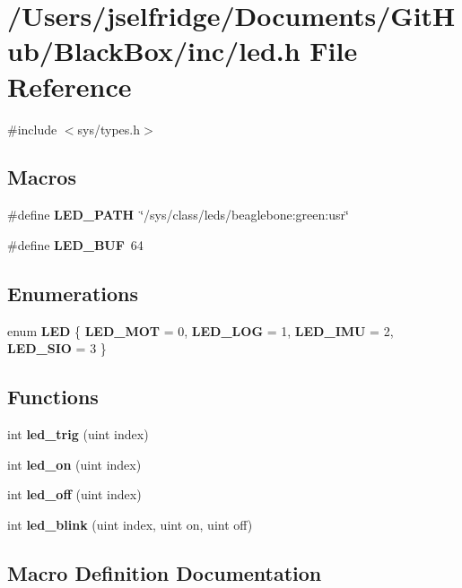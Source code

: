 \section{/\+Users/jselfridge/\+Documents/\+Git\+Hub/\+Black\+Box/inc/led.h File Reference}
\label{led_8h}
{\ttfamily \#include $<$sys/types.\+h$>$}\newline
\subsection*{Macros}
\begin{DoxyCompactItemize}
\item 
\#define \textbf{ L\+E\+D\+\_\+\+P\+A\+TH}~\char`\"{}/sys/class/leds/beaglebone\+:green\+:usr\char`\"{}
\item 
\#define \textbf{ L\+E\+D\+\_\+\+B\+UF}~64
\end{DoxyCompactItemize}
\subsection*{Enumerations}
\begin{DoxyCompactItemize}
\item 
enum \textbf{ L\+ED} \{ \textbf{ L\+E\+D\+\_\+\+M\+OT} = 0, 
\textbf{ L\+E\+D\+\_\+\+L\+OG} = 1, 
\textbf{ L\+E\+D\+\_\+\+I\+MU} = 2, 
\textbf{ L\+E\+D\+\_\+\+S\+IO} = 3
 \}
\end{DoxyCompactItemize}
\subsection*{Functions}
\begin{DoxyCompactItemize}
\item 
int \textbf{ led\+\_\+trig} (uint index)
\item 
int \textbf{ led\+\_\+on} (uint index)
\item 
int \textbf{ led\+\_\+off} (uint index)
\item 
int \textbf{ led\+\_\+blink} (uint index, uint on, uint off)
\end{DoxyCompactItemize}


\subsection{Macro Definition Documentation}
\mbox{\label{led_8h_a8782887ed18d839c34ba557c7db0bfd6}} 
